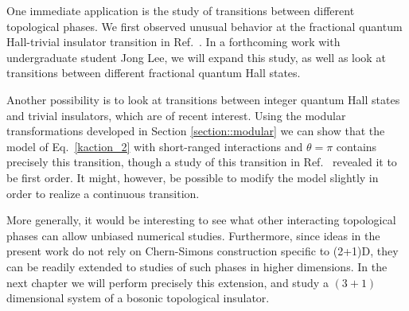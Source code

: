 One immediate application is the study of transitions between different topological phases. We first observed unusual behavior at the fractional quantum Hall-trivial insulator transition in Ref.~\cite{short_range3}. In a forthcoming work with undergraduate student Jong Lee, we will expand this study, as well as look at transitions between different fractional quantum Hall states.

Another possibility is to look at transitions between integer quantum Hall states and trivial insulators, which are of recent interest.\cite{GroverVishwanath2012, LuLee2012_QPT} Using the modular transformations developed in Section \ref{section::modular} we can show that the model of Eq.~\ref{kaction_2} with short-ranged interactions and $\theta=\pi$ contains precisely this transition, though a study of this transition in Ref.~\cite{Loopy} revealed it to be first order. It might, however, be possible to modify the model slightly in order to realize a continuous transition.

More generally, it would be interesting to see what other interacting topological phases can allow unbiased numerical studies. Furthermore, since ideas in the present work do not rely on Chern-Simons construction specific to (2+1)D, they can be readily extended to studies of such phases in higher dimensions.\cite{VishwanathSenthil2012, KeyserlingkBurnellSimon2013, XuSenthil2013, Wen2013}
In the next chapter we will perform precisely this extension, and study a $(3+1)$ dimensional system of a bosonic topological insulator.



